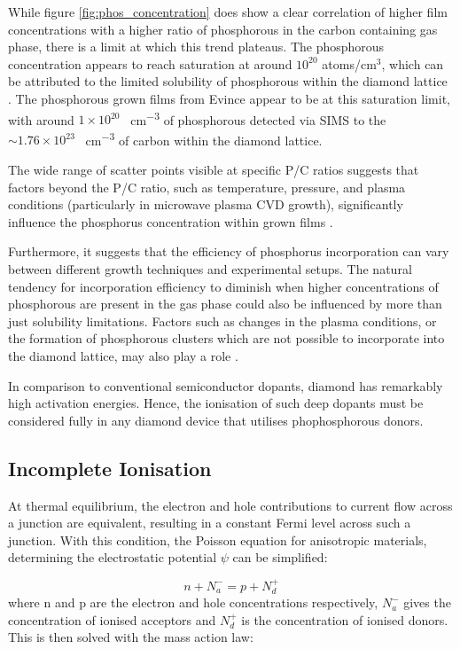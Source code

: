 \begin{refsection}
While figure \ref{fig:phos_concentration} does show a clear correlation of higher film concentrations with a higher ratio of phosphorous in the carbon containing gas phase, there is a limit at which this trend plateaus. The phosphorous concentration appears to reach saturation at around $10^{20}$ atoms/cm$^{3}$, which can be attributed to the limited solubility of phosphorous within the diamond lattice \cite{Koizumi2008-ig}. The phosphorous grown films from Evince appear to be at this saturation limit, with around $1\times10^{20}$ \si{\atoms\per\centi\metre\cubed} of phosphorous detected via SIMS to the $\sim1.76\times10^{23}$ \si{\atoms\per\centi\metre\cubed} of carbon within the diamond lattice.

The wide range of scatter points visible at specific P/C ratios suggests that factors beyond the P/C ratio, such as temperature, pressure, and plasma conditions (particularly in microwave plasma CVD growth), significantly influence the phosphorus concentration within grown films \cite{Lloret2023}.

Furthermore, it suggests that the efficiency of phosphorus incorporation can vary between different growth techniques and experimental setups. The natural tendency for incorporation efficiency to diminish when higher concentrations of phosphorous are present in the gas phase could also be influenced by more than just solubility limitations. Factors such as changes in the plasma conditions, or the formation of phosphorous clusters which are not possible to incorporate into the diamond lattice, may also play a role \cite{Janssen2014}.

In comparison to conventional semiconductor dopants, diamond has remarkably high activation energies. Hence, the ionisation of such deep dopants must be considered fully in any diamond device that utilises phophosphorous donors.

\subsection{Incomplete Ionisation}
At thermal equilibrium, the electron and hole contributions to current flow across a junction are equivalent, resulting in a constant Fermi level across such a junction. With this condition, the Poisson equation for anisotropic materials, determining the electrostatic potential $\psi$ can be simplified:

\begin{equation}
    \label{eq:poisson_3.10_tesfaye}
\end{equation}
\begin{equation}
    n + N^{-}_{a}=p+N^{+}_{d}
    \label{eq:poisson_simplified_tesfaye}
\end{equation}
where n and p are the electron and hole concentrations respectively, $N^{-}_{a}$ gives the concentration of ionised acceptors and $N^{+}_{d}$ is the concentration of ionised donors. This is then solved with the mass action law:


\end{refsection}
